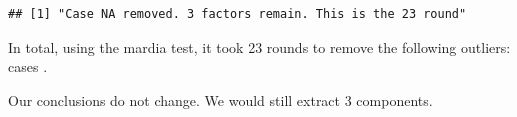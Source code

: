 \documentclass{article}\usepackage[]{graphicx}\usepackage[]{color}
\makeatletter
\newenvironment{kframe}{%
 \def\at@end@of@kframe{}%
 \ifinner\ifhmode%
  \def\at@end@of@kframe{\end{minipage}}%
  \begin{minipage}{\columnwidth}%
 \fi\fi%
 \def\FrameCommand##1{\hskip\@totalleftmargin \hskip-\fboxsep
 \colorbox{shadecolor}{##1}\hskip-\fboxsep
     \hskip-\linewidth \hskip-\@totalleftmargin \hskip\columnwidth}%
 \MakeFramed {\advance\hsize-\width
   \@totalleftmargin\z@ \linewidth\hsize
   \@setminipage}}%
 {\par\unskip\endMakeFramed%
 \at@end@of@kframe}
\newenvironment{knitrout}{}{} %
\makeatother
\begin{document}
\begin{knitrout}
\begin{kframe}\begin{verbatim}
## [1] "Case NA removed. 3 factors remain. This is the 23 round"
\end{verbatim}
\end{kframe}
\end{knitrout}

In total, using the mardia test, it took 23 rounds to remove the following outliers: cases .

Our conclusions do not change. We would still extract 3 components.
\end{document}
